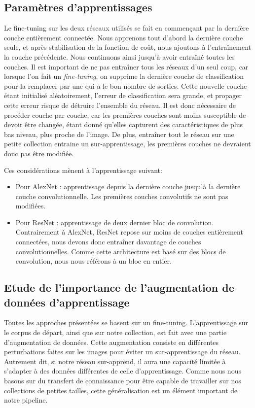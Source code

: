\subsection{Paramètres d'apprentissages}

Le fine-tuning sur les deux réseaux utilisés se fait en commençant par la dernière couche entièrement connectée.
Nous apprenons tout d'abord la dernière couche seule, et après stabilisation de la fonction de coût, nous ajoutons à l'entraînement la couche précédente.
Nous continuons ainsi jusqu'à avoir entraîné toutes les couches.
Il est important de ne pas entraîner tous les réseaux d'un seul coup, car lorsque l'on fait un \textit{fine-tuning}, on supprime la dernière couche de classification pour la remplacer par une qui a le bon nombre de sorties.
Cette nouvelle couche étant initialisé aléatoirement, l'erreur de classification sera grande, et propager cette erreur risque de détruire l'ensemble du réseau.
Il est donc nécessaire de procéder couche par couche, car les premières couches sont moins susceptible de devoir être changée, étant donné qu'elles capturent des caractéristiques de plus bas niveau, plus proche de l'image.
De plus, entraîner tout le réseau sur une petite collection entraine un sur-apprentissage, les premières couches ne devraient donc pas être modifiée.

Ces considérations mènent à l'apprentissage suivant:

\begin{itemize}
	\item Pour AlexNet : apprentissage depuis la dernière couche jusqu'à la dernière couche convolutionnelle. Les premières couches convolutifs ne sont pas modifiées.
	\item Pour ResNet : apprentissage de deux dernier bloc de convolution. Contrairement à AlexNet, ResNet repose sur moins de couches entièrement connectées, nous devons donc entraîner davantage de couches convolutionnelles. Comme cette architecture est basé sur des blocs de convolution, nous nous référons à un bloc en entier.
\end{itemize}


\subsection{Etude de l'importance de l'augmentation de données d'apprentissage}
\label{subsec:dataaug}

Toutes les approches présentées se basent sur un fine-tuning.
L'apprentissage sur le corpus de départ, ainsi que sur notre collection, est fait avec une partie d'augmentation de données.
Cette augmentation consiste en différentes perturbations faites sur les images pour éviter un sur-apprentissage du réseau.
Autrement dit, si notre réseau sur-apprend, il aura une capacité limitée à s'adapter à des données différentes de celle d'apprentissage.
Comme nous nous basons sur du transfert de connaissance pour être capable de travailler sur nos collections de petites tailles, cette généralisation est un élément important de notre pipeline.

